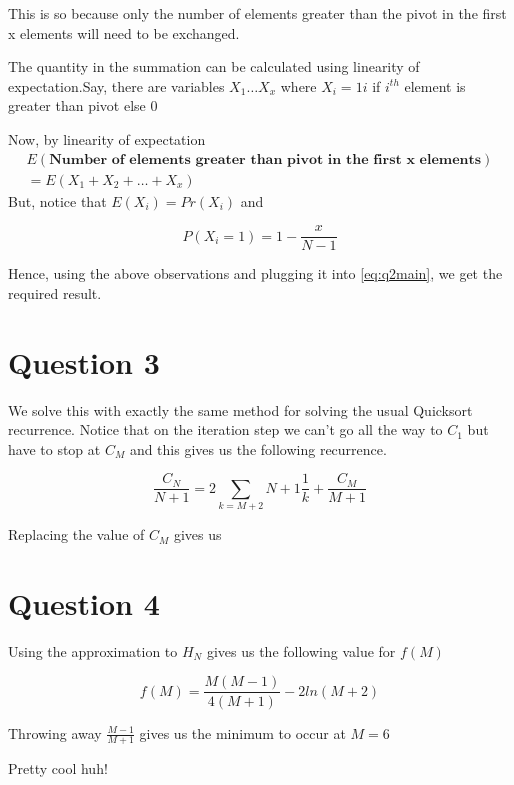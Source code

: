 \documentclass[a4paper,12pt]{article}
\begin{document}
This is so because only the number of elements greater than the pivot in the first x elements will need to be exchanged. 

The quantity in the summation can be calculated using linearity of expectation.Say, there are variables $X_1 \ldots X_x$ where $X_i = 1i$ if $i^{th}$ element is greater than pivot else 0

Now, by linearity of expectation 
\begin{equation}
	\begin{split}
	E(\textbf{Number of elements greater than pivot in the first x elements}) \\
		= E(X_1+X_2+ \ldots + X_x)
	\end{split}
\end{equation}
But, notice that $E(X_i) = Pr(X_i)$ and 

\begin{equation}
	P(X_i = 1) = 1 - \frac{x}{N-1}
\end{equation}

Hence, using the above observations and plugging it into \eqref{eq:q2main}, we get the required result.

\centerline{}

\newpage
\section*{Question 3}
We solve this with exactly the same method for solving the usual Quicksort recurrence. Notice that on the iteration step we can't go all the way to $C_1$ but have to stop at $C_M$ and this gives us the following recurrence. 

\begin{equation}
	\frac{C_N}{N+1} = 2 \sum_{k=M+2}{N+1} \frac{1}{k} + \frac{C_M}{M+1}
\end{equation}

Replacing the value of $C_M$ gives us

\section*{Question 4}
Using the approximation to $H_N$ gives us the following value for $f(M)$

\begin{equation}
	f(M) = \frac{M(M-1)}{4(M+1)} - 2ln(M+2)
\end{equation}

Throwing away $\frac{M-1}{M+1}$ gives us the minimum to occur at $M = 6$

Pretty cool huh! 
\end{document}
